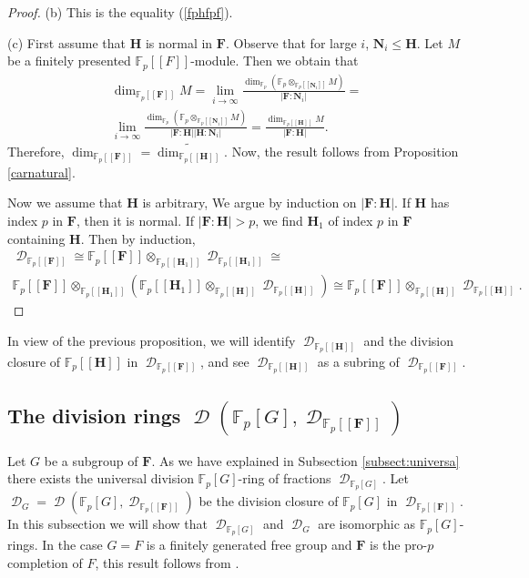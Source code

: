 \documentclass[11pt]{amsart}
\numberwithin{claimcounter}{lem}
\DeclareMathOperator{\D}{\mathcal D}
\newcommand{\F}{\mathbb{F}}
\begin{document}
\begin{proof}
(b) This is the equality (\ref{fphfpf}).




 (c)  First assume that $\mathbf H$ is normal in $\mathbf F$. Observe that for large $i$, $\mathbf N_i\le \mathbf H$. Let $M$ be a finitely presented $\F_p[[F]]$-module. Then we obtain that
 \begin{multline*}
 \dim_{\F_p[[\mathbf F]]} M= \lim_{i\to \infty}\frac{\dim_{\F_p}(\F_p \otimes_{\F_p[[\mathbf N_i]]}M )}{|\mathbf F:\mathbf N_i|} =\\ \lim_{i\to \infty}\frac{\dim_{\F_p}(\F_p \otimes_{\F_p[[\mathbf N_i]]}M )}{|\mathbf F:\mathbf H||\mathbf H:\mathbf N_i|} =\frac{\dim_{\F_p[[\mathbf H]]} M}{|\mathbf F:\mathbf H|}.\end{multline*}
 Therefore, $ \dim_{\F_p[[\mathbf F]]} =\widetilde{ \dim_{\F_p[[\mathbf H]]} }$. Now, the result follows from Proposition \ref{carnatural}.
 
 
Now we assume that $\mathbf H$ is arbitrary,  We argue by induction on $|\mathbf F:\mathbf H|$. If $\mathbf H$ has index $p$ in $\mathbf F$, then it is normal. If  $|\mathbf F:\mathbf H|>p$, we find $\mathbf H_1$ of index $p$ in $\mathbf F$ containing $\mathbf H$. Then by induction,
\begin{multline*}\D_{\F_p[[\mathbf F]]}\cong \F_p[[\mathbf F]]\otimes_{\F_p[[\mathbf H_1]]} \D_{\F_p[[\mathbf H_1]]}\cong\\  \F_p[[\mathbf F]]\otimes_{\F_p[[\mathbf H_1]]} 
(\F_p[[\mathbf  H_1]]\otimes_{\F_p[[\mathbf H]]} \D_{\F_p[[\mathbf H]]})\cong \F_p[[\mathbf F]]\otimes_{\F_p[[\mathbf H]]} \D_{\F_p[[\mathbf H]]}.\end{multline*}
 \end{proof}
 In view of the previous proposition, we will identify  $\D_{\F_p[[\mathbf H]]}$ and  the division closure of $\F_p[[\mathbf H]]$ in $\D_{\F_p[[\mathbf F]]}$, and see $\D_{\F_p[[\mathbf H]]}$ as a subring of $\D_{\F_p[[\mathbf F]]}$.
 
 
 

 
 
  

\subsection{The division rings $\D(\F_p[G],\D_{\F_p[[\mathbf F]]})$}
Let $G$ be a subgroup of $\mathbf F$. As we have explained in Subsection \ref{subsect:universa} there exists the universal division $\F_p[G]$-ring of fractions $\D_{\F_p[G]}$. Let $\D_G=\D(\F_p[G],\D_{\F_p[[\mathbf F]]})$ be the division closure of $\F_p[G]$ in  $\D_{\F_p[[\mathbf F]]}$. 
In this subsection we will show  that $\D_{\F_p[G]}$ and $\D_G$ are isomorphic as $\F_p[G]$-rings. 
In the case $G=F$ is a finitely generated free group and $\mathbf F$ is the pro-$p$ completion of $F$, this result follows from \cite[Corollary 2.9.16]{Cohfree}.
\end{document}
